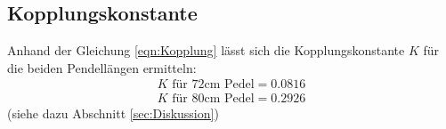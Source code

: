 \subsection{Kopplungskonstante}
Anhand der Gleichung \ref{eqn:Kopplung} lässt sich die Kopplungskonstante $K$ für
die beiden Pendellängen ermitteln:
\begin{gather}
    K \textrm{ für 72cm Pedel} = 0.0816\\
    K \textrm{ für 80cm Pedel} = 0.2926
    \label{eqn:kopplung80}
\end{gather}
(siehe dazu Abschnitt \ref{sec:Diskussion})


